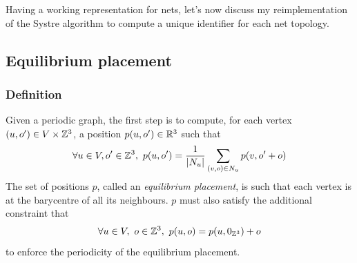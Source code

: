 \documentclass[main.tex]{subfiles}
\begin{document}

Having a working representation for nets, let's now discuss my reimplementation of the Systre algorithm \autocite{Systre} to compute a unique identifier for each net topology.



\subsection{Equilibrium placement}

\subsubsection{Definition}

Given a periodic graph, the first step is to compute, for each vertex $(u,o')\in V\times\mathbb{Z}^3$, a position $p(u,o')\in\mathbb{R}^3$ such that
\begin{equation}
	\forall u\in V,o'\in\mathbb{Z}^3,\ p(u,o') = \frac1{\left|N_{u}\right|}\sum_{(v,o)\in N_{u}}p(v,o'+o)
	\label{equilibrium1}
\end{equation}
The set of positions $p$, called an \emph{equilibrium placement}, is such that each vertex is at the barycentre of all its neighbours. $p$ must also satisfy the additional constraint that
\begin{equation}
	\forall u\in V,\ o\in\mathbb{Z}^3,\ p(u,o) = p(u,0_{\mathbb{Z}^3}) + o
	\label{equilibrium2}
\end{equation}
to enforce the periodicity of the equilibrium placement.
\end{document}
